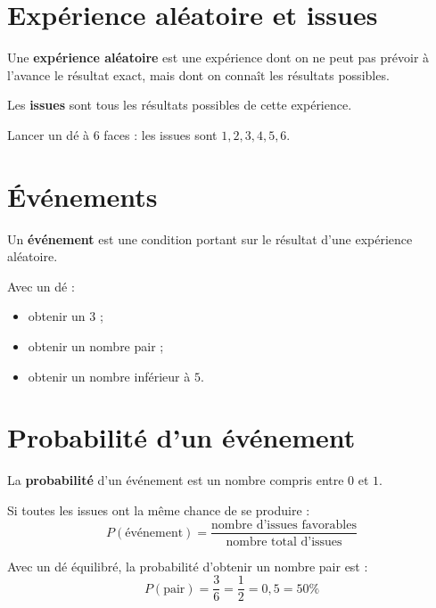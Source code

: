 \documentclass[11pt,a4paper,twoside]{book}
\begin{document}
\section{Expérience aléatoire et issues}
\begin{definitionbox}
Une \textbf{expérience aléatoire} est une expérience dont on ne peut pas prévoir à l'avance
le résultat exact, mais dont on connaît les résultats possibles.

Les \textbf{issues} sont tous les résultats possibles de cette expérience.
\end{definitionbox}

\begin{exemplebox}
Lancer un dé à 6 faces : les issues sont \(1,2,3,4,5,6\).
\end{exemplebox}

\section{Événements}
\begin{definitionbox}
Un \textbf{événement} est une condition portant sur le résultat d'une expérience aléatoire.
\end{definitionbox}

\begin{exemplebox}
Avec un dé :
\begin{itemize}
\item obtenir un \(3\) ;
\item obtenir un nombre pair ;
\item obtenir un nombre inférieur à \(5\).
\end{itemize}
\end{exemplebox}

\section{Probabilité d'un événement}
\begin{definitionbox}
La \textbf{probabilité} d'un événement est un nombre compris entre \(0\) et \(1\).
\end{definitionbox}

\begin{methodebox}
Si toutes les issues ont la même chance de se produire :
\[
P(\text{événement})=\frac{\text{nombre d'issues favorables}}{\text{nombre total d'issues}}
\]
\end{methodebox}

\begin{exemplebox}
Avec un dé équilibré, la probabilité d'obtenir un nombre pair est :
\[
P(\text{pair})=\frac{3}{6}=\frac{1}{2}=0{,}5=50\%
\]
\end{exemplebox}
\end{document}
